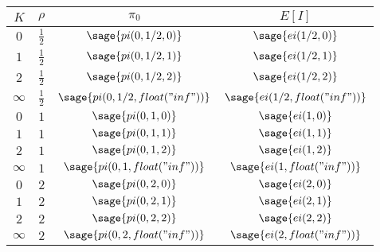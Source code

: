\documentclass{article}
\begin{document}
\begin{tabular}{c | c || c | c}
$K$ & $\rho$ & $\pi_0$ & $E[I]$ \\
\hline
\hline
$0$ & $\frac{1}{2}$ & $\sage{pi(0, 1/2, 0)}$ & $\sage{ei(1/2, 0)}$ \\
$1$ & $\frac{1}{2}$ & $\sage{pi(0, 1/2, 1)}$ & $\sage{ei(1/2, 1)}$ \\
$2$ & $\frac{1}{2}$ & $\sage{pi(0, 1/2, 2)}$ & $\sage{ei(1/2, 2)}$ \\
$\infty$ & $\frac{1}{2}$ & $\sage{pi(0, 1/2, float("inf"))}$
& $\sage{ei(1/2, float("inf"))}$ \\
\hline
$0$ & $1$ & $\sage{pi(0, 1, 0)}$ & $\sage{ei(1, 0)}$ \\
$1$ & $1$ & $\sage{pi(0, 1, 1)}$ & $\sage{ei(1, 1)}$ \\
$2$ & $1$ & $\sage{pi(0, 1, 2)}$ & $\sage{ei(1, 2)}$ \\
$\infty$ & $1$ & $\sage{pi(0, 1, float("inf"))}$
& $\sage{ei(1, float("inf"))}$ \\
\hline
$0$ & $2$ & $\sage{pi(0, 2, 0)}$ & $\sage{ei(2, 0)}$ \\
$1$ & $2$ & $\sage{pi(0, 2, 1)}$ & $\sage{ei(2, 1)}$ \\
$2$ & $2$ & $\sage{pi(0, 2, 2)}$ & $\sage{ei(2, 2)}$ \\
$\infty$ & $2$ & $\sage{pi(0, 2, float("inf"))}$
& $\sage{ei(2, float("inf"))}$
\end{tabular}


\end{document}
